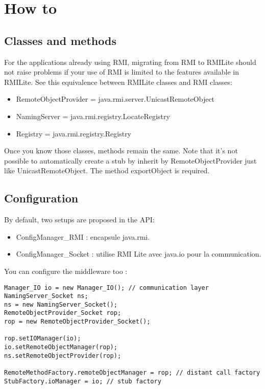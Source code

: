 \chapter{How to}

\section{Classes and methods}
For the applications already using RMI, migrating from RMI to RMILite should not raise problems if your use of RMI is limited to the features available in RMILite. See this equivalence between RMILite classes and RMI classes:
\begin{itemize}
\item RemoteObjectProvider = java.rmi.server.UnicastRemoteObject
\item NamingServer = java.rmi.registry.LocateRegistry
\item Registry = java.rmi.registry.Registry
\end{itemize}
\medskip
Once you know those classes, methods remain the same. Note that it's not possible to automatically create a stub by inherit by RemoteObjectProvider just like UnicastRemoteObject. The method exportObject is required.

\section{Configuration}
By default, two setups are proposed in the API: 
\begin{itemize}
\item ConfigManager\_RMI : encapsule java.rmi.
\item ConfigManager\_Socket : utilise RMI Lite avec java.io pour la communication.
\end{itemize}
\medskip
You can configure the middleware too :
\begin{lstlisting}
Manager_IO io = new Manager_IO(); // communication layer
NamingServer_Socket ns;
ns = new NamingServer_Socket();
RemoteObjectProvider_Socket rop;
rop = new RemoteObjectProvider_Socket();

rop.setIOManager(io);
io.setRemoteObjectManager(rop);
ns.setRemoteObjectProvider(rop);

RemoteMethodFactory.remoteObjectManager = rop; // distant call factory
StubFactory.ioManager = io; // stub factory
\end{lstlisting}

